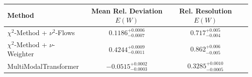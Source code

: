     \begin{tabular}{lccc}
        \toprule
        Method & Mean Rel. Deviation $E(W)$ & Rel. Resolution $E(W)$ \\
        \midrule
        $\chi^2$-Method + $\nu^2$-Flows & $0.1186^{+0.0006}_{-0.0007}$ & $0.717^{+0.005}_{-0.004}$ \\
        $\chi^2$-Method + $\nu$-Weighter & $0.4244^{+0.0009}_{-0.0011}$ & $0.862^{+0.006}_{-0.005}$ \\
        MultiModalTransformer & $-0.0515^{+0.0002}_{-0.0003}$ & $0.3285^{+0.0010}_{-0.0005}$ \\
        \bottomrule
    \end{tabular}